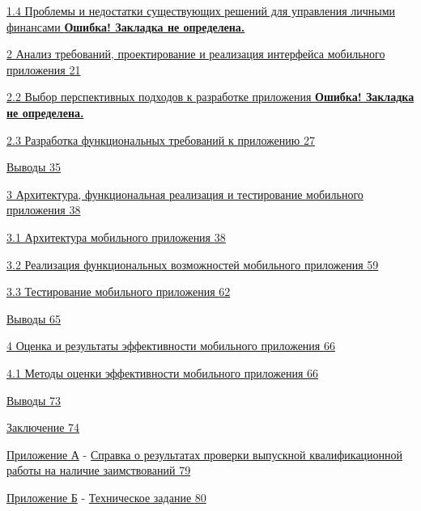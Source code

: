 \hyperref[_Toc167813678]{1.4 Проблемы и недостатки существующих решений
для управления личными финансами
\hyperref[_Toc167813678]{\textbf{Ошибка! Закладка не определена.}}}

\hyperref[ux43fux440ux435ux434ux43bux430ux433ux430ux435ux43cux43eux435-ux440ux435ux448ux435ux43dux438ux435]{2
Анализ требований, проектирование и реализация интерфейса мобильного
приложения
\hyperref[ux43fux440ux435ux434ux43bux430ux433ux430ux435ux43cux43eux435-ux440ux435ux448ux435ux43dux438ux435]{21}}

\hyperref[_Toc167813680]{2.2 Выбор перспективных подходов к разработке
приложения \hyperref[_Toc167813680]{\textbf{Ошибка! Закладка не
определена.}}}

\hyperref[_Toc167813681]{2.3 Разработка функциональных требований к
приложению \hyperref[_Toc167813681]{27}}

\hyperref[_Toc167813682]{Выводы \hyperref[_Toc167813682]{35}}

\hyperref[_Toc167813683]{3 Архитектура, функциональная реализация и
тестирование мобильного приложения \hyperref[_Toc167813683]{38}}

\hyperref[_Toc167813684]{3.1 Архитектура мобильного приложения
\hyperref[_Toc167813684]{38}}

\hyperref[_Toc167813685]{3.2 Реализация функциональных возможностей
мобильного приложения \hyperref[_Toc167813685]{59}}

\hyperref[_Toc167813686]{3.3 Тестирование мобильного приложения
\hyperref[_Toc167813686]{62}}

\hyperref[_Toc167813687]{Выводы \hyperref[_Toc167813687]{65}}

\hyperref[_Toc167813688]{4 Оценка и результаты эффективности мобильного
приложения \hyperref[_Toc167813688]{66}}

\hyperref[_Toc167813689]{4.1 Методы оценки эффективности мобильного
приложения \hyperref[_Toc167813689]{66}}

\hyperref[_Toc167813690]{Выводы \hyperref[_Toc167813690]{73}}

\hyperref[_Toc167813691]{Заключение \hyperref[_Toc167813691]{74}}

\hyperref[_Toc167813692]{Приложение А} -
\hyperref[_Toc167813693]{Справка о результатах проверки выпускной
квалификационной работы на наличие заимствований
\hyperref[_Toc167813693]{79}}

\hyperref[_Toc167813694]{Приложение Б} -
\hyperref[_Toc167813695]{Техническое задание
\hyperref[_Toc167813695]{80}}

